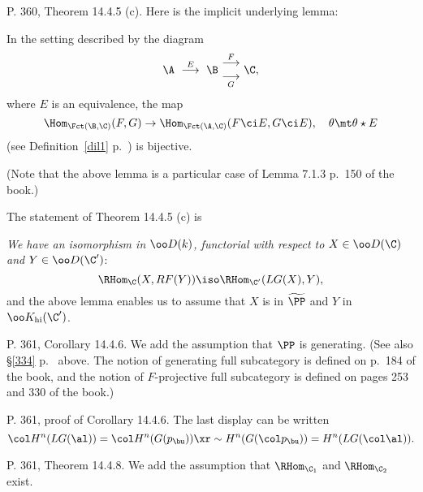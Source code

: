 \documentclass[12pt]{article}
\theoremstyle{remark}
\theoremstyle{definition}
\begin{document}
\begin{s}
P. 360, Theorem 14.4.5 (c). Here is the implicit underlying lemma:
\begin{lem}
In the setting described by the diagram 
$$
\A\ \overset{E}{\longrightarrow}\ \B\ 
\begin{matrix}\overset{F}{\longrightarrow}\\ \underset{G}{\longrightarrow}\end{matrix}
\ \C,
$$ 
where $E$ is an equivalence, the map 
$$
\Hom_{\Fct(\B,\C)}(F,G)\to\Hom_{\Fct(\A,\C)}(F\ci E,G\ci E),\quad\theta\mt\theta\star E
$$ 
(see Definition~\ref{dil1} p.~) is bijective.
\end{lem}

(Note that the above lemma is a particular case of Lemma 7.1.3 p.~150 of the book.)

The statement of Theorem 14.4.5 (c) is 

\nn\emph{We have an isomorphism in $\oo D(k)$, functorial with respect to $X\in\oo D(\C)$ and $Y\in\oo D(\C')$}:
$$
\RHom_\C(X,RF(Y))\iso\RHom_{\C'}(LG(X),Y),
$$ 
and the above lemma enables us to assume that $X$ is in $\widetilde\PP$ and $Y$ in $\oo K_{\text{hi}}(\C')$. 
\end{s}

%

\begin{s}
P. 361, Corollary 14.4.6. We add the assumption that $\PP$ is generating. %
(See also \S\ref{334} p.~\pr{334} above. The notion of generating full subcategory is defined on p.~184 of the book, and the notion of $F$-projective full subcategory is defined on pages 253 and 330 of the book.)
\end{s}

%

\begin{s}
P. 361, proof of Corollary 14.4.6. The last display can be written
$$
\col H^n(LG(\al))=\col H^n(G(p_\bu))\xr\sim H^n(G(\col p_\bu))=H^n(LG(\col\al)).
$$
\end{s}

%

\begin{s}
P. 361, Theorem 14.4.8. We add the assumption that $\RHom_{\C_1}$ and $\RHom_{\C_2}$ exist.%
\end{s}
\end{document}
